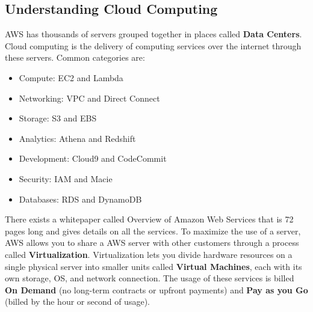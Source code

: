 \documentclass{article}%
\begin{document}
\subsection{Understanding Cloud Computing}
AWS has thousands of servers grouped together in places called \textbf{Data Centers}. Cloud computing is the delivery of computing services over the internet through these servers. Common categories are:
\begin{itemize}
    \item Compute: EC2 and Lambda
    \item Networking: VPC and Direct Connect
    \item Storage: S3 and EBS
    \item Analytics: Athena and Redshift
    \item Development: Cloud9 and CodeCommit
    \item Security: IAM and Macie
    \item Databases: RDS and DynamoDB
\end{itemize}
There exists a whitepaper called Overview of Amazon Web Services that is 72 pages long and gives details on all the services.
To maximize the use of a server, AWS allows you to share a AWS server with other customers through a process called \textbf{Virtualization}. Virtualization lets you divide hardware resources on a single physical server into smaller units called \textbf{Virtual Machines}, each with its own storage, OS, and network connection. The usage of these services is billed \textbf {On Demand} (no long-term contracts or upfront payments) and \textbf{Pay as you Go} (billed by the hour or second of usage).
\end{document}
